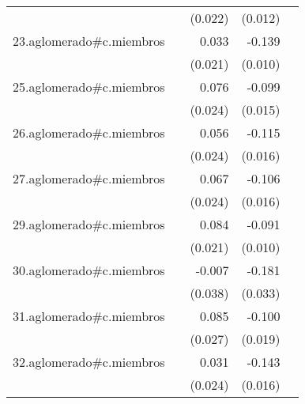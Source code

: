 {\begin{longtable}{l*{4}{D{.}{.}{-1}}}
            &                     &     (0.022)         &     (0.012)         &                     \\
\addlinespace
23.aglomerado#c.miembros&                     &       0.033         &      -0.139\sym{***}&                     \\
            &                     &     (0.021)         &     (0.010)         &                     \\
\addlinespace
25.aglomerado#c.miembros&                     &       0.076\sym{**} &      -0.099\sym{***}&                     \\
            &                     &     (0.024)         &     (0.015)         &                     \\
\addlinespace
26.aglomerado#c.miembros&                     &       0.056\sym{*}  &      -0.115\sym{***}&                     \\
            &                     &     (0.024)         &     (0.016)         &                     \\
\addlinespace
27.aglomerado#c.miembros&                     &       0.067\sym{**} &      -0.106\sym{***}&                     \\
            &                     &     (0.024)         &     (0.016)         &                     \\
\addlinespace
29.aglomerado#c.miembros&                     &       0.084\sym{***}&      -0.091\sym{***}&                     \\
            &                     &     (0.021)         &     (0.010)         &                     \\
\addlinespace
30.aglomerado#c.miembros&                     &      -0.007         &      -0.181\sym{***}&                     \\
            &                     &     (0.038)         &     (0.033)         &                     \\
\addlinespace
31.aglomerado#c.miembros&                     &       0.085\sym{**} &      -0.100\sym{***}&                     \\
            &                     &     (0.027)         &     (0.019)         &                     \\
\addlinespace
32.aglomerado#c.miembros&                     &       0.031         &      -0.143\sym{***}&                     \\
            &                     &     (0.024)         &     (0.016)         &                     \\

\end{longtable}}
